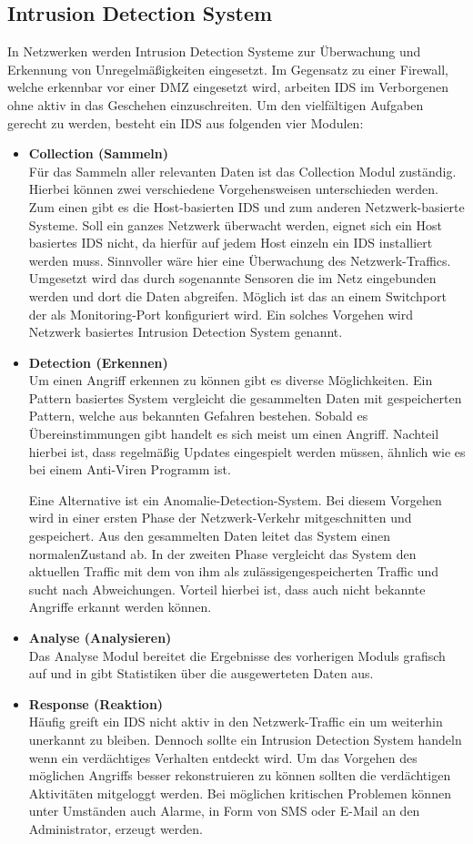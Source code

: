 \subsection{Intrusion Detection System}
In Netzwerken werden Intrusion Detection Systeme zur Überwachung und Erkennung von Unregelmäßigkeiten eingesetzt. Im Gegensatz zu einer Firewall, welche erkennbar vor einer DMZ eingesetzt wird, arbeiten IDS im Verborgenen ohne aktiv in das Geschehen einzuschreiten. 
Um den vielfältigen Aufgaben gerecht zu werden, besteht ein IDS aus folgenden vier Modulen:
\begin{itemize}							%
\item{\textbf{Collection (Sammeln)}} 
\\Für das Sammeln aller relevanten Daten ist das Collection Modul zuständig. Hierbei können zwei verschiedene Vorgehensweisen unterschieden werden. Zum einen gibt es die Host-basierten IDS und zum anderen Netzwerk-basierte Systeme. Soll ein ganzes Netzwerk überwacht werden, eignet sich ein Host basiertes IDS nicht, da hierfür auf jedem Host einzeln ein IDS installiert werden muss. Sinnvoller wäre hier eine Überwachung des Netzwerk-Traffics. Umgesetzt wird das durch sogenannte Sensoren die im Netz eingebunden werden und dort die Daten abgreifen. Möglich ist das an einem Switchport der als Monitoring-Port konfiguriert wird. Ein solches Vorgehen wird Netzwerk basiertes Intrusion Detection System genannt. 
\item{\textbf{Detection (Erkennen)}} 
\\Um einen Angriff erkennen zu können gibt es diverse Möglichkeiten. Ein Pattern basiertes System vergleicht die gesammelten Daten mit gespeicherten Pattern, welche aus bekannten Gefahren bestehen. Sobald es Übereinstimmungen gibt handelt es sich meist um einen Angriff. Nachteil hierbei ist, dass regelmäßig Updates eingespielt werden müssen, ähnlich wie es bei einem Anti-Viren Programm ist.

Eine Alternative ist ein Anomalie-Detection-System. Bei diesem Vorgehen wird in einer ersten Phase der Netzwerk-Verkehr mitgeschnitten und gespeichert. Aus den gesammelten Daten leitet das System einen \glqq normalen\grqq Zustand ab. In der zweiten Phase vergleicht das System den aktuellen Traffic mit dem von ihm als \glqq zulässigen\grqq gespeicherten Traffic und sucht nach Abweichungen. Vorteil hierbei ist, dass auch nicht bekannte Angriffe erkannt werden können.
\item{\textbf{Analyse (Analysieren)}} 
\\Das Analyse Modul bereitet die Ergebnisse des vorherigen Moduls grafisch auf und in gibt Statistiken über die ausgewerteten Daten aus. 
\item{\textbf{Response (Reaktion)}} 
\\Häufig greift ein IDS nicht aktiv in den Netzwerk-Traffic ein um weiterhin unerkannt zu bleiben. Dennoch sollte ein Intrusion Detection System handeln wenn ein verdächtiges Verhalten entdeckt wird. Um das Vorgehen des möglichen Angriffs besser rekonstruieren zu können sollten die verdächtigen Aktivitäten mitgeloggt werden. Bei möglichen kritischen Problemen können unter Umständen auch Alarme, in Form von SMS oder E-Mail an den Administrator, erzeugt werden.
\end{itemize}
